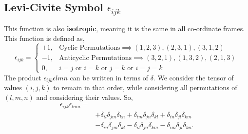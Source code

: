 \documentclass{book}
\begin{document}
\subsection{Levi-Civite Symbol $\epsilon_{ijk}$}
This function is also \textbf{isotropic}, meaning it is the same in all co-ordinate frames. This function is defined as,
\begin{equation}
    \epsilon_{ijk} = 
    \begin{cases}
        +1, & \text{Cyclic Permutations} \implies (1,2,3),(2,3,1),(3,1,2)\\
        -1, & \text{Anticyclic Permutations} \implies (3,2,1),(1,3,2),(2,1,3)\\
        0, & i = j \text{ or } i = k \text{ or } j = k \text{ or } i = j = k
    \end{cases}
\end{equation}
The product $\epsilon_{ijk}\epsilon{lmn}$ can be written in terms of $\delta$. We consider the tensor of values $(i,j,k)$ to remain in that order, while considering all permutations of $(l,m,n)$ and considering their values. So,
\begin{equation}
    \begin{split}
        \epsilon_{ijk}\epsilon_{lmn} = & \\
        & +\delta_{il}\delta_{jm}\delta_{kn} +\delta_{im}\delta_{jn}\delta_{kl} +\delta_{in}\delta_{jl}\delta_{km} \\
        & -\delta_{in}\delta_{jm}\delta_{kl} -\delta_{il}\delta_{jn}\delta_{km} -\delta_{im}\delta_{jl}\delta_{kn}.
    \end{split}
\end{equation}
\end{document}
